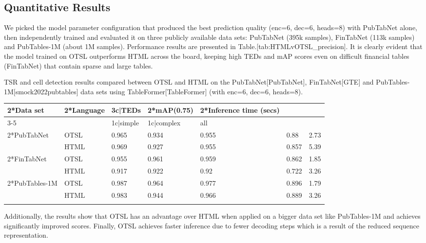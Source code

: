 \documentclass[11pt,a4paper]{article}
\begin{document}
\subsection{Quantitative Results}

We picked the model parameter configuration that produced the best prediction quality (enc=6, dec=6, heads=8) with PubTabNet alone, then independently trained and evaluated it on three publicly available data sets: PubTabNet (395k samples), FinTabNet (113k samples) and PubTables-1M (about 1M samples). Performance results are presented in Table.[tab:HTMLvOTSL\_precision]. It is clearly evident that the model trained on OTSL outperforms HTML across the board, keeping high TEDs and mAP scores even on difficult financial tables (FinTabNet) that contain sparse and large tables.

TSR and cell detection results compared between OTSL and HTML on the PubTabNet[PubTabNet], FinTabNet[GTE] and PubTables-1M[smock2022pubtables] data sets using TableFormer[TableFormer] (with enc=6, dec=6, heads=8).

\begin{table}[h]
\begin{tabular}{|l|l|l|l|l|l|l|}
\hline
2*Data set & 2*Language & 3c|TEDs & 2*mAP(0.75) & 2*Inference   time (secs) &  &  \\ \hline
3-5 &  & 1c|simple & 1c|complex & all &  &  \\ \hline
2*PubTabNet & OTSL & 0.965 & 0.934 & 0.955 & 0.88 & 2.73 \\ \hline
 & HTML & 0.969 & 0.927 & 0.955 & 0.857 & 5.39 \\ \hline
2*FinTabNet & OTSL & 0.955 & 0.961 & 0.959 & 0.862 & 1.85 \\ \hline
 & HTML & 0.917 & 0.922 & 0.92 & 0.722 & 3.26 \\ \hline
2*PubTables-1M & OTSL & 0.987 & 0.964 & 0.977 & 0.896 & 1.79 \\ \hline
 & HTML & 0.983 & 0.944 & 0.966 & 0.889 & 3.26 \\ \hline
 &  &  &  &  &  &  \\ \hline
\end{tabular}
\end{table}

Additionally, the results show that OTSL has an advantage over HTML when applied on a bigger data set like PubTables-1M and achieves significantly improved scores. Finally, OTSL achieves faster inference due to fewer decoding steps which is a result of the reduced sequence representation.
\end{document}
